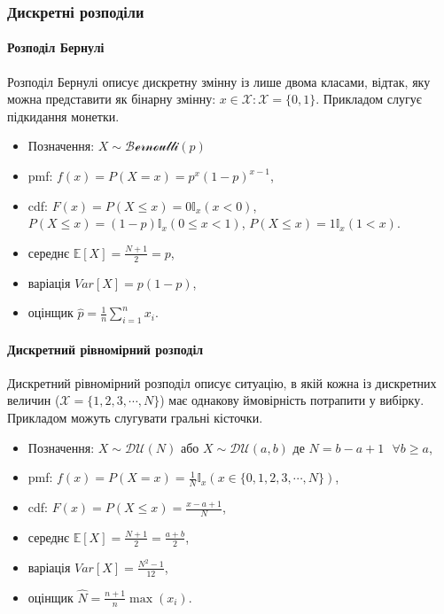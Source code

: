 \documentclass[
  11pt,
]{book}
\begin{document}
\subsubsection{Дискретні розподіли}\label{ux434ux438ux441ux43aux440ux435ux442ux43dux456-ux440ux43eux437ux43fux43eux434ux456ux43bux438}

\paragraph{Розподіл Бернулі}\label{ux440ux43eux437ux43fux43eux434ux456ux43b-ux431ux435ux440ux43dux443ux43bux456}

Розподіл Бернулі описує дискретну змінну із лише двома класами, відтак, яку можна представити як бінарну змінну: \(x \in \mathcal{X}: \mathcal{X} = \{0, 1\}\). Прикладом слугує підкидання монетки.

\begin{itemize}
\item
  Позначення: \(X \sim \mathcal{Bernoulli}(p)\)
\item
  pmf: \(f(x) = P(X = x) = p^x (1-p)^{x-1}\),
\item
  cdf: \(F(x) = P(X \leq x) = 0 \mathbb{I}_x(x < 0)\), \(P(X \leq x) = (1 - p) \mathbb{I}_x(0 \leq x < 1)\), \(P(X \leq x) = 1 \mathbb{I}_x(1 < x)\).
\item
  середнє \(\mathbb{E} [X] = \frac{N+1}{2} = p\),
\item
  варіація \(Var[X] = p(1 - p)\),
\item
  оцінщик \(\hat{p} = \frac{1}{n} \sum \limits_{i=1}^{n}x_i\).
\end{itemize}

\paragraph{Дискретний рівномірний розподіл}\label{ux434ux438ux441ux43aux440ux435ux442ux43dux438ux439-ux440ux456ux432ux43dux43eux43cux456ux440ux43dux438ux439-ux440ux43eux437ux43fux43eux434ux456ux43b}

Дискретний рівномірний розподіл описує ситуацію, в якій кожна із дискретних величин (\(\mathcal{X} = \{1, 2, 3, \cdots, N\}\)) має однакову ймовірність потрапити у вибірку. Прикладом можуть слугувати гральні кісточки.

\begin{itemize}
\item
  Позначення: \(X \sim \mathcal{DU}(N)\) або \(X \sim \mathcal{DU}(a, b)\) де \(N = b - a + 1 \text { } \forall b \geq a\),
\item
  pmf: \(f(x) = P(X = x) = \frac{1}{N} \mathbb{I}_x (x \in \{0, 1, 2, 3, \cdots, N\})\),
\item
  cdf: \(F(x) = P(X \leq x) = \frac{x - a + 1}{N}\),
\item
  середнє \(\mathbb{E} [X] = \frac{N+1}{2} = \frac{a+b}{2}\),
\item
  варіація \(Var[X] = \frac{N^2 - 1}{12}\),
\item
  оцінщик \(\hat{N} = \frac{n+1}{n} \max (x_i)\).
\end{itemize}
\end{document}
